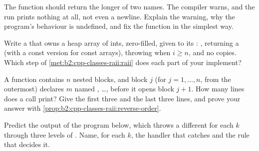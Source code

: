 \begin{exercise}[$\star$]\label{exo:b2:cpp-classes-raii:2}
The function  should return the longer of two names. The compiler warns, and the run prints nothing
at all, not even a newline. Explain the warning, why the program's behaviour is undefined, and fix the function in
the simplest way.
\end{exercise}

\begin{exercise}[$\star$]\label{exo:b2:cpp-classes-raii:3}
Write a   that owns a heap array of  ints, zero-filled, given to its :
,  returning a  (with a const version for const arrays), throwing
 when $i \geq n$, and no copies. Which step of \cref{met:b2:cpp-classes-raii:raii} does each
part of your  implement?
\end{exercise}

\begin{exercise}[$\star$]\label{exo:b2:cpp-classes-raii:4}
A function contains $n$ nested blocks, and block $j$ (for $j = 1, \dots, n$, from the outermost) declares $m$
  named , \dots,  before it opens block $j+1$. How many lines does a call
print? Give the first three and the last three  lines, and prove your answer with
\cref{prop:b2:cpp-classes-raii:reverse-order}.
\end{exercise}

\begin{exercise}[$\star\star$]\label{exo:b2:cpp-classes-raii:5}
Predict the output of the program below, which throws a different  for each $k$ through three levels of
. Name, for each $k$, the handler that catches and the rule that decides it.
\end{exercise}

